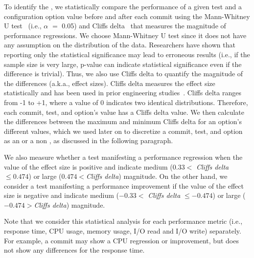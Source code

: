 To identify the \inconsistent, we statistically compare the performance of a given test and a configuration option value before and after each commit using the %
Mann-Whitney U test~\cite{nachar2008mann} %
(i.e., $\alpha$ $=$ 0.05) and Cliff\textquotesingle s delta~\cite{ES2006:Becker} that measures the magnitude of performance regressions. We choose Mann-Whitney U test since it does not have any assumption on the distribution of the data. Researchers have shown that reporting only the statistical significance may lead to erroneous results (i.e., if the sample size is very large, p-value can indicate statistical significance even if the difference is trivial). Thus, we also use Cliff\textquotesingle s delta to quantify the magnitude of the differences (a.k.a., effect sizes). Cliff\textquotesingle s delta measures the effect size statistically and has been used in prior engineering studies~\cite{ICSE2002:Kitchenham, Liao2020LogPerfReg, DBLP:journals/ese/LiCSH18}. Cliff\textquotesingle s delta ranges from -1 to +1, where a value of 0 indicates two identical distributions. Therefore, each commit, test, and option's value has a Cliff\textquotesingle s delta value. We then calculate the differences between the maximum and minimum Cliff\textquotesingle s delta for an option's different values, which we used later on to discretize a commit, test, and option as an \inconsistent or a non \inconsistent, as discussed in the following paragraph.

We also measure whether a test manifesting a performance regression when the value of the effect size is positive and indicate medium ($0.33 <$ \emph{Cliff\textquotesingle s delta} $\leqslant 0.474$) or large ($0.474 < $\emph{Cliff\textquotesingle s delta}) magnitude. On the other hand, we consider a test manifesting a performance improvement if the value of the effect size is negative and indicate medium ($-0.33 <$ \emph{Cliff\textquotesingle s delta} $\leqslant -0.474$) or large ($-0.474 > $\emph{Cliff\textquotesingle s delta}) magnitude. 


Note that we consider this statistical analysis for each performance metric (i.e., response time, CPU usage, memory usage, I/O read and I/O write) separately. For example, a commit may show a CPU regression or improvement, but does not show any differences for the response time. 


